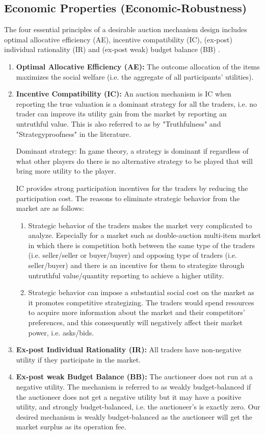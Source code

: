\subsection {Economic Properties (Economic-Robustness)}
The four essential principles of a desirable auction mechanism design includes optimal allocative efficiency (AE), incentive compatibility (IC), (ex-post) individual rationality (IR) and (ex-post weak) budget balance (BB) \cite{Krishna02}.

\begin{enumerate}
\item \textbf{Optimal Allocative Efficiency (AE):} The outcome allocation of the items maximizes the social welfare (i.e. the aggregate of all participants' utilities).
\item \textbf{Incentive Compatibility (IC):} An auction mechanism is IC when reporting the true valuation is a dominant strategy for all the traders, i.e. no trader can improve its utility gain from the market by reporting an untruthful value. This is also referred to as by "Truthfulness" and "Strategyproofness" in the literature.
\begin{Definition}
Dominant strategy: In game theory, a strategy is dominant if regardless of what other players do there is no alternative strategy to be played that will bring more utility to the player.
\end{Definition}
IC provides strong participation incentives for the traders by reducing the participation cost. The reasons to eliminate strategic behavior from the market are as follows:
\begin{enumerate}
\item Strategic behavior of the traders makes the market very complicated to analyze. Especially for a market such as double-auction multi-item market in which there is competition both between the same type of the traders (i.e. seller/seller or buyer/buyer) and opposing type of traders (i.e. seller/buyer) and there is an incentive for them to strategize through untruthful value/quantity reporting to achieve a higher utility.

\item Strategic behavior can impose a substantial social cost on the market as it promotes competitive strategizing. The traders would spend resources to acquire more information about the market and their competitors' preferences, and this consequently will negatively affect their market power, i.e. asks/bids.
\end{enumerate}
\item \textbf{Ex-post Individual Rationality (IR):} All traders have non-negative utility if they participate in the market.
\item \textbf{Ex-post weak Budget Balance (BB):} The auctioneer does not run at a negative utility. The mechanism is referred to as weakly budget-balanced if the auctioneer does not get a negative utility but it may have a positive utility, and strongly budget-balanced, i.e. the auctioneer's is exactly zero. Our desired mechanism is weakly budget-balanced as the auctioneer will get the market surplus as its operation fee.
\end{enumerate}
